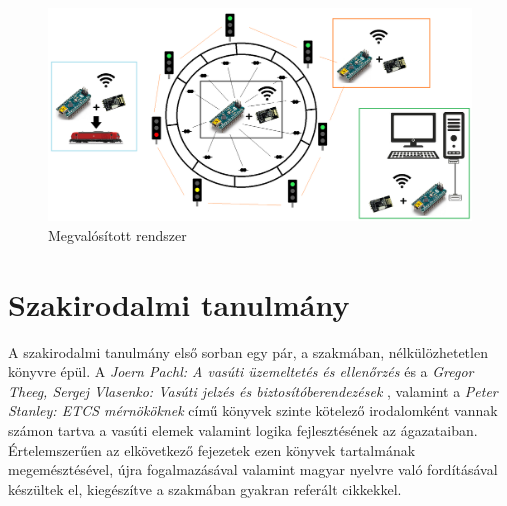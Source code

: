 \documentclass[a4paper,12pt]{article}
\begin{document}
\begin{figure}[htp]
    \centering
	\includegraphics[width=\linewidth]{images/realizedsys.png}
    \caption[Megvalósított rendszer elvi rajz]{Megvalósított rendszer}
	\label{fig:realizedsys}
\end{figure}
\section{Szakirodalmi tanulmány}\label{RAbasics}

A szakirodalmi tanulmány első sorban egy pár, a szakmában, nélkülözhetetlen könyvre épül.
A \textit {Joern Pachl: A vasúti üzemeltetés és ellenőrzés} \cite{jp09} és a \textit {Gregor Theeg, Sergej Vlasenko: Vasúti jelzés és biztosítóberendezések} \cite{gtsv18}, valamint a \textit{Peter Stanley: ETCS mérnököknek}\cite{ps11} című könyvek szinte kötelező irodalomként vannak számon tartva a vasúti elemek valamint logika fejlesztésének az ágazataiban. 
Értelemszerűen az elkövetkező fejezetek ezen könyvek tartalmának megemésztésével, újra fogalmazásával valamint magyar nyelvre való fordításával készültek el, kiegészítve a szakmában gyakran referált cikkekkel.
\end{document}
